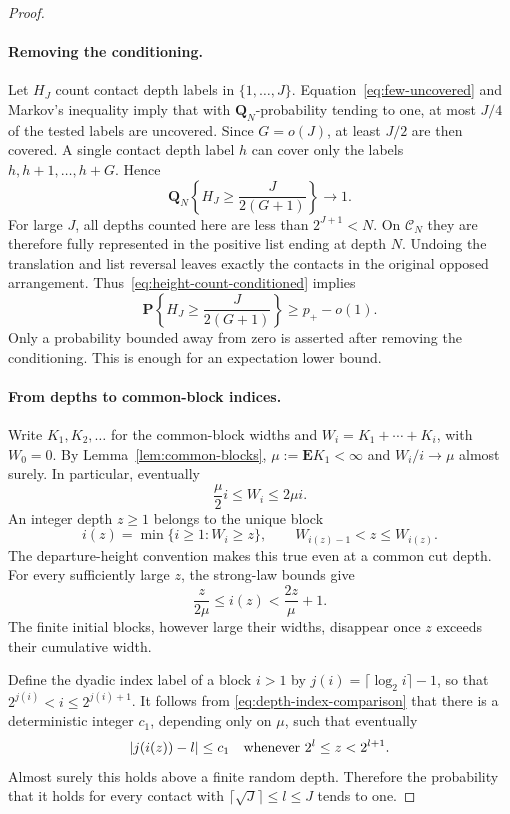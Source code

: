 \begin{proof}
\paragraph{Removing the conditioning.}
Let $H_J$ count contact depth labels in $\{1,\ldots,J\}$.
Equation~\eqref{eq:few-uncovered} and Markov's inequality imply
that with $\mathbf Q_N$-probability tending to one, at most $J/4$
of the tested labels are uncovered.  Since $G=o(J)$, at least
$J/2$ are then covered.  A single contact depth label $h$ can cover
only the labels $h,h+1,\ldots,h+G$.  Hence
\begin{equation}\label{eq:height-count-conditioned}
 \mathbf Q_N\left\{H_J\ge\frac{J}{2(G+1)}\right\}
 \longrightarrow1.
\end{equation}
For large $J$, all depths counted here are less than $2^{J+1}<N$.
On $\mathcal C_N$ they are therefore fully represented in the
positive list ending at depth $N$.  Undoing the translation and list
reversal leaves exactly the contacts in the original opposed
arrangement.  Thus~\eqref{eq:height-count-conditioned} implies
\begin{equation}\label{eq:height-count-unconditioned}
 \mathbf P\left\{H_J\ge\frac{J}{2(G+1)}\right\}
 \ge p_+-o(1).
\end{equation}
Only a probability bounded away from zero is asserted after removing
the conditioning.  This is enough for an expectation lower bound.

\paragraph{From depths to common-block indices.}
Write $K_1,K_2,\ldots$ for the common-block widths and
$W_i=K_1+\cdots+K_i$, with $W_0=0$.  By
Lemma~\ref{lem:common-blocks}, $\mu:=\mathbf E K_1<\infty$ and
$W_i/i\to\mu$ almost surely.  In particular, eventually
\[
 \frac\mu2 i\le W_i\le2\mu i.
\]
An integer depth $z\ge1$ belongs to the unique block
\[
 i(z)=\min\{i\ge1:W_i\ge z\},
 \qquad W_{i(z)-1}<z\le W_{i(z)}.
\]
The departure-height convention makes this true even at a common
cut depth.  For every sufficiently large $z$, the strong-law bounds
give
\begin{equation}\label{eq:depth-index-comparison}
 \frac{z}{2\mu}\le i(z)<\frac{2z}{\mu}+1.
\end{equation}
The finite initial blocks, however large their widths, disappear once
$z$ exceeds their cumulative width.

Define the dyadic index label of a block $i>1$ by
$j(i)=\lceil\log_2 i\rceil-1$, so that
$2^{j(i)}<i\le2^{j(i)+1}$.  It follows from
\eqref{eq:depth-index-comparison} that there is a deterministic
integer $c_1$, depending only on $\mu$, such that eventually
\begin{equation}\label{eq:bounded-label-shift}
 |j(i(z))-l|\le c_1
 \quad\hbox{whenever }2^l\le z<2^{l+1}.
\end{equation}
Almost surely this holds above a finite random depth.  Therefore
the probability that it holds for every contact with
$\lceil\sqrt J\rceil\le l\le J$ tends to one.


\end{proof}
